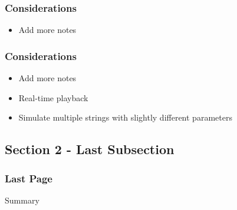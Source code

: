 \documentclass{beamer}
\begin{document}
\begin{frame}\frametitle{Considerations}
\begin{itemize}
\item Add more notes
\end{itemize}
\end{frame}

\begin{frame}\frametitle{Considerations}
\begin{itemize}
\item Add more notes
\item Real-time playback
\item Simulate multiple strings with slightly different parameters
\end{itemize}
\end{frame}

\subsection[]{Section 2 - Last Subsection}

\begin{frame}\frametitle{Last Page}
	\begin{block}{Summary}
	\end{block}
\end{frame}
\end{document}
